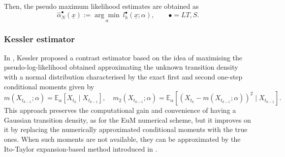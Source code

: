\documentclass[a4paper,12pt]{article}
\numberwithin{equation}{section}
\theoremstyle{plain}
\theoremstyle{definition}
\begin{document}
Then, the pseudo maximum likelihood estimates are obtained as 
\begin{equation}\label{eqn:MLE estimator}
\hat\alpha^{\bullet}_N( \underline x):=\underset{\alpha}{\arg \min}\   l_h^\bullet(\underline x;\alpha),\qquad \bullet= LT, S.
\end{equation}
\subsubsection{Kessler estimator} 
In \cite{kessler_estimation_1997}, Kessler proposed a contrast estimator based on the idea of maximising the pseudo-log-likelihood obtained  approximating the unknown transition density with a normal distribution characterised by the exact first and second one-step conditional moments given by
\begin{equation}\label{eqn:moment functions}
    m(X_{t_{k-1}};\alpha)=\mathbb{E}_{\alpha}\left[X_{t_{k}}\mid X_{t_{k-1}}\right],\quad m_2(X_{t_{k-1}};\alpha)=\mathbb{E}_{\alpha}\left[\left(X_{t_{k}}-m(X_{t_{k-1}};\alpha)\right)^2\mid X_{t_{k-1}}\right].
\end{equation}
This approach preserves the computational gain and convenience of having a Gaussian transition density, as for the EuM numerical scheme, but it improves on it by replacing the numerically approximated conditional moments with the true ones. When such moments are not available, they can be approximated by the Ito-Taylor expansion-based method introduced in \cite{florens-zmirou_approximate_1989}.
\end{document}
